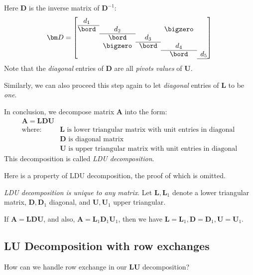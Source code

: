Here $\bm D$ is the inverse matrix of $\bm D^{-1}$:
\[
\bm D=\left[
    \begin{array}{@{}ccccc@{}}
    d_1    &        &     &     &  \\ \cline{1-1}
    \bord & d_2       &    &  \bigzero   &  \\ \cline{2-2}
          & \bord    & d_3    &     &  \\ \cline{3-3}
          & \bigzero & \bord & d_4    &  \\ \cline{4-4}
          &          &       & \bord & d_5 \\ \cline{5-5}
  \end{array}\right]
\]
Note that the \textit{diagonal} entries of $\bm D$ are all \emph{pivots values} of $\bm U$.

Similarly, we can also proceed this step again to let \textit{diagonal} entries of $\bm L$ to be \emph{one}.
\begin{definition}
In conclusion, we decompose matrix $\bm A$ into the form:
\[
\begin{array}{ll}
\bm A=\bm L\bm D\bm U\\
\mbox{where: }
&
\mbox{$\bm L$ is lower triangular matrix with unit entries in diagonal}\\
&
\mbox{$\bm D$ is diagonal matrix}\\
&
\mbox{$\bm U$ is upper triangular matrix with unit entries in diagonal}
\end{array}
\]
This decomposition is called \emph{LDU decomposition}.
\end{definition}
Here is a property of LDU decomposition, the proof of which is omitted.
\begin{proposition}
\emph{LDU decomposition is unique to any matrix}. Let $\bm L,\bm L_1$ denote a lower triangular matrix, $\bm D,\bm D_1$ diagonal, and $\bm U,\bm U_1$ upper triangular. 

If $\bm A=\bm{LDU}$, and also, $\bm A=\bm L_1\bm D_1\bm U_1$, then we have $\bm L=\bm L_1,\bm D=\bm D_1,\bm U=\bm U_1$.
\end{proposition}
\subsection{LU Decomposition with row exchanges}
How can we handle row exchange in our $\bm{LU}$ decomposition? 

